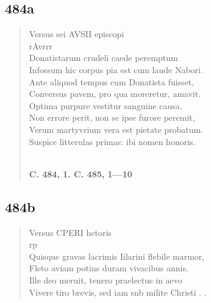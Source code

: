 \documentclass[11pt, a4paper]{report}
\begin{document}
            \subsection*{484a}
      \begin{verse}
      Versus sei AVSII episcopi \\ rAvrrr \\ Donatistarum crudeli caede peremptum \\ Infossum hic corpus pia est cum laude Nabori. \\ Ante aliquod tempus cum Donatista fuisset, \\ Conversus pavem, pro qua moreretur, amavit. \\ Optima purpure vestitur sanguine causa. \\ Non errore perit, non se ipse furore peremit, \\ Verum martyvrium vera est pietate probatum. \\ Suspice litterulas primas: ibi nomen honoris. \\ 
        ﻿\pagebreak 
    \begin{center} \textbf{C. 484, 1. C. 485, 1—10} \end{center}
      \end{verse}
  
            \subsection*{484b}
      \begin{verse}
      Versus CPERI hetoris \\ rp \\ Quisque gravas lacrimis Iilarini flebile marmor, \\ Fleto aviam potins duram vivacibus annis. \\ Ille deo meruit, tenero praelectus in aevo \\ Vivere tiro brevis, sed iam snb milite Christi . . \\ 
      \end{verse}
  
\end{document}
